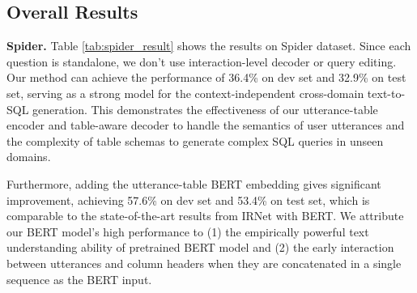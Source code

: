 \documentclass[11pt,a4paper]{article}
\begin{document}
\begin{table*}[ht!]
\centering
{}
\caption{ATIS results on dev set and test set.}
\vspace{-3mm}
\label{tab:atis_result}
\end{table*} 
\subsection{Overall Results}
\textbf{Spider.}
Table \ref{tab:spider_result} shows the results on Spider dataset.
Since each question is standalone, we don't use interaction-level decoder or query editing.
Our method can achieve the performance of 36.4\% on dev set and 32.9\% on test set, serving as a strong model for the context-independent cross-domain text-to-SQL generation.
This demonstrates the effectiveness of our utterance-table encoder and table-aware decoder to handle the semantics of user utterances and the complexity of table schemas to generate complex SQL queries in unseen domains.

Furthermore, adding the utterance-table BERT embedding gives significant improvement, achieving 57.6\% on dev set and 53.4\% on test set, which is comparable to the state-of-the-art results from IRNet with BERT.
We attribute our BERT model's high performance to (1) the empirically powerful text understanding ability of pretrained BERT model and (2) the early interaction between utterances and column headers when they are concatenated in a single sequence as the BERT input.
\end{document}
